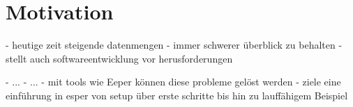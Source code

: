 \chapter{Motivation}
- heutige zeit steigende datenmengen
- immer schwerer überblick zu behalten
- stellt auch softwareentwicklung vor herusforderungen

- ...
- ...
- mit tools wie Eeper können diese probleme gelöst werden
- ziele eine einführung in esper von setup über erste schritte bis hin zu lauffähigem Beispiel